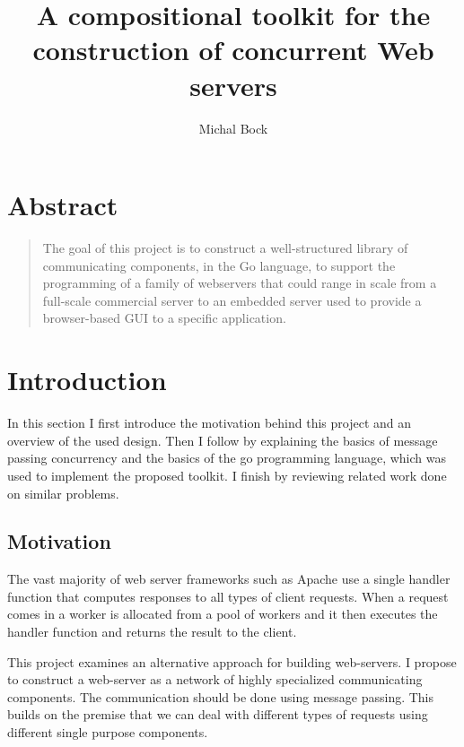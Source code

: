 \documentclass[12pt,a4paper]{article}
\title{A compositional toolkit for the construction of concurrent Web servers}
\author{Michal Bock}
\date{}
\begin{document}
\maketitle
\thispagestyle{empty}


\newpage
\section*{Abstract}
\begin{quote}
The goal of this project is to construct a well-structured
library of communicating components, in the Go language, to support
the programming of a family of webservers that could range in scale 
from a full-scale commercial server to an embedded server used to provide 
a browser-based GUI to a specific application.
\end{quote}

\newpage
{}
\tableofcontents

\newpage
\section{Introduction}
In this section I first introduce the motivation behind this project
and an overview of the used design. Then I follow
by explaining the basics of message passing concurrency and the basics
of the go programming language, which was used to implement the proposed 
toolkit. I finish by reviewing related work done on similar problems.

\subsection{Motivation}
The vast majority of web server frameworks such as Apache
use a single handler function that
computes responses to all types of client requests. When a request comes in a 
worker is allocated from a pool of workers and it then executes the handler function
and returns the result to the client.

This project examines an alternative approach for building web-servers. 
I propose to construct a web-server as a network of highly specialized 
communicating components. The communication should be done using
message passing. This builds on the premise that we can deal
with different types of requests using different single purpose components.
\end{document}
